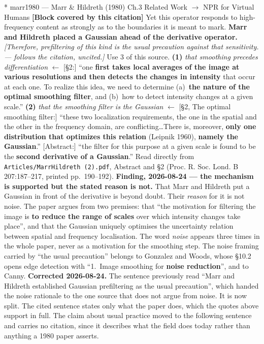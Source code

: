 \documentclass[11pt, a4paper]{article}
\makeatletter
\newcounter{citentry}
\newcommand{\citentry@core}[7]{%
  \stepcounter{citentry}
  \begingroup
  \sbox{\citentry@measurebox}{%
    \begin{minipage}{\linewidth}
      \noindent\colorbox{konstanzblue}{\parbox{\dimexpr\linewidth-2\fboxsep}{%
        \vspace{3pt}
        \textbf{\#\thecitentry \quad #2} \hfill \textit{#3}
        \vspace{3pt}
      }}
      \vspace{3pt}
      \noindent\begin{tabular}{@{}p{2.7cm} p{\dimexpr\linewidth-3cm}@{}}
        \textit{\small Sentence in thesis:} & #4 \\[5pt]
        \textbf{Usage:}\hfill       & #5 \\[5pt]
        \textit{\small Original source:}     & #6 \\[5pt]
        \textbf{How to check:}             & #7 \\
      \end{tabular}
      \vspace{5pt}
      \rule{10pt}{10pt}\quad \textbf{Validated} --- I have read the original and agree it supports the sentence.
    \end{minipage}%
  }%
  \Needspace{\dimexpr\ht\citentry@measurebox+\dp\citentry@measurebox\relax}%
  \endgroup
  \vspace{10pt}
  \noindent\colorbox{konstanzblue}{\parbox{\dimexpr\linewidth-2\fboxsep}{%
    \vspace{3pt}
    \textcolor{white}{\textbf{\#\thecitentry \quad #2}} \hfill \textcolor{white}{\textit{#3}}
    \vspace{3pt}
  }}
  \vspace{3pt}
  \noindent\begin{tabular}{@{}p{2.7cm} p{\dimexpr\linewidth-3cm}@{}}
    \textit{\small Sentence in thesis:} & \textcolor{darkgreen}{#4} \\[5pt]
    \textbf{Usage:}\hfill       & #5 \\[5pt]
    \textit{\small Original source:}     & \textcolor{darkred}{#6} \\[5pt]
    \textbf{How to check:}             & #7 \\
  \end{tabular}
  \vspace{5pt}
  \noindent\CheckBox[name=verified\thecitentry, width=10pt, height=10pt, bordercolor={0 0 0}, borderwidth=0.75, backgroundcolor={1 1 1}#1]{}\quad \textbf{Validated} --- I have read the original and agree it supports the sentence.
  \vspace{3pt}
  \noindent\textcolor{midgray}{\rule{\linewidth}{0.4pt}}
}
\newcommand{\citentry}{\@ifstar{\citentry@core{, checked}}{\citentry@core{}}}
\makeatother
\begin{document}
\begin{Form}
\citentry*
  {marr1980 --- Marr \& Hildreth (1980)}
  {Ch.3 Related Work $\rightarrow$ NPR for Virtual Humans}
  {\textbf{[Block covered by this citation]} Yet this operator responds to high-frequency content as strongly as to the boundaries it is meant to mark. \textbf{Marr and Hildreth placed a Gaussian ahead of the derivative operator.} \emph{[Therefore, prefiltering of this kind is the usual precaution against that sensitivity. --- follows the citation, uncited.]}}
  {Use 3 of this source.}
  {\textbf{(1)} \emph{that smoothing precedes differentiation} $\leftarrow$ [\S2:] ``one \textbf{first takes local averages of the image at various resolutions and then detects the changes in intensity} that occur at each one. To realize this idea, we need to determine (a)~\textbf{the nature of the optimal smoothing filter}, and (b)~how to detect intensity changes at a given scale.'' \quad \textbf{(2)} \emph{that the smoothing filter is the Gaussian} $\leftarrow$ [\S2, The optimal smoothing filter:] ``these two localization requirements, the one in the spatial and the other in the frequency domain, are conflicting\ldots There is, moreover, \textbf{only one distribution that optimizes this relation} (Leipnik 1960), \textbf{namely the Gaussian}.'' [Abstract:] ``the filter for this purpose at a given scale is found to be the \textbf{second derivative of a Gaussian}.''}
  {Read directly from \texttt{\footnotesize Articles/MarrHildreth (2).pdf}, Abstract and \S2 (Proc. R. Soc. Lond. B 207:187--217, printed pp.~190--192). \textbf{Finding, 2026-08-24 --- the mechanism is supported but the stated reason is not.} That Marr and Hildreth put a Gaussian in front of the derivative is beyond doubt. Their \emph{reason} for it is not noise. The paper argues from two premises: that ``the motivation for filtering the image is \textbf{to reduce the range of scales} over which intensity changes take place'', and that the Gaussian uniquely optimises the uncertainty relation between spatial and frequency localisation. The word \emph{noise} appears three times in the whole paper, never as a motivation for the smoothing step. The noise framing carried by ``the usual precaution'' belongs to Gonzalez and Woods, whose \S10.2 opens edge detection with ``1.~Image smoothing for \textbf{noise reduction}'', and to Canny. \textbf{Corrected 2026-08-24.} The sentence previously read ``Marr and Hildreth established Gaussian prefiltering as the usual precaution'', which handed the noise rationale to the one source that does not argue from noise. It is now split. The cited sentence states only what the paper does, which the quotes above support in full. The claim about usual practice moved to the following sentence and carries no citation, since it describes what the field does today rather than anything a 1980 paper asserts.}


\end{Form}
\end{document}
